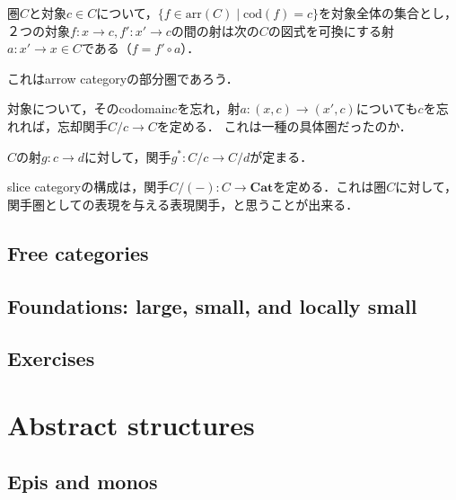 \documentclass[uplatex, 12pt, dvipdfmx]{jsarticle}
\begin{document}
圏$C$と対象$c\in C$について，$\{ f\in\mathrm{arr}(C)\mid \mathrm{cod}(f)=c \}$を対象全体の集合とし，２つの対象$f:x\to c, f':x'\to c$の間の射は次の$C$の図式を可換にする射$a:x'\to x\in C$である（$f=f'\circ a$）．
\begin{center}\end{center}
これはarrow categoryの部分圏であろう．

対象について，そのcodomain$c$を忘れ，射$a:(x,c)\to (x',c)$についても$c$を忘れれば，忘却関手$C/c\to C$を定める．
これは一種の具体圏だったのか．

$C$の射$g:c\to d$に対して，関手$g^*:C/c\to C/d$が定まる．
\begin{center}\end{center}

slice categoryの構成は，関手$C/(-):C\to \mathbf{Cat}$を定める．これは圏$C$に対して，関手圏としての表現を与える表現関手，と思うことが出来る．

\subsection{Free categories}
\subsection{Foundations: large, small, and locally small}
\subsection{Exercises}

\section{Abstract structures}

\subsection{Epis and monos}
\end{document}
